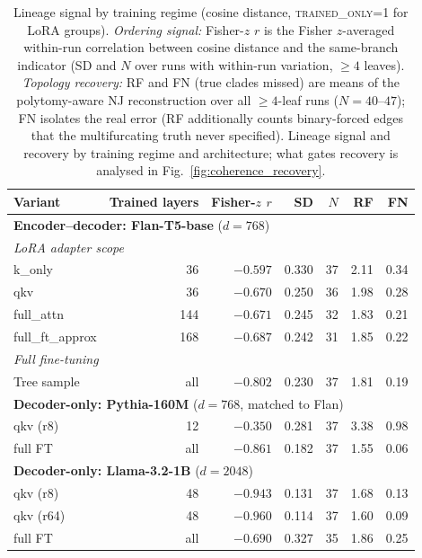 \documentclass{article}
\theoremstyle{definition}
\theoremstyle{plain}
\begin{document}
\begin{table}[t]
\caption{Lineage signal by training regime (cosine distance, \textsc{trained\_only=1} for
  LoRA groups). \emph{Ordering signal:} Fisher-$z$ $r$ is the Fisher $z$-averaged within-run
  correlation between cosine distance and the same-branch indicator (SD and $N$ over runs with
  within-run variation, $\geq 4$ leaves). \emph{Topology recovery:} RF and FN (true clades
  missed) are means of the polytomy-aware NJ reconstruction over all $\geq 4$-leaf runs
  ($N=40$--$47$); FN isolates the real error (RF additionally counts binary-forced edges that
  the multifurcating truth never specified). Lineage signal and recovery by training regime and
  architecture; what gates recovery is analysed in Fig.~\ref{fig:coherence_recovery}.}
\label{tab:variants}
\begin{center}
\begin{tabular}{lrrrrrr}
\toprule
Variant & Trained layers & Fisher-$z$ $r$ & SD & $N$ & RF & FN \\
\midrule
\multicolumn{7}{l}{\textbf{Encoder--decoder: Flan-T5-base} ($d=768$)} \\
\multicolumn{7}{l}{\quad\textit{LoRA adapter scope}} \\
\quad k\_only          &  36 & $-0.597$ & 0.330 & 37 & 2.11 & 0.34 \\
\quad qkv              &  36 & $-0.670$ & 0.250 & 36 & 1.98 & 0.28 \\
\quad full\_attn       & 144 & $-0.671$ & 0.245 & 32 & 1.83 & 0.21 \\
\quad full\_ft\_approx & 168 & $-0.687$ & 0.242 & 31 & 1.85 & 0.22 \\
\multicolumn{7}{l}{\quad\textit{Full fine-tuning}} \\
\quad Tree sample      & all & $-0.802$ & 0.230 & 37 & 1.81 & 0.19 \\
\midrule
\multicolumn{7}{l}{\textbf{Decoder-only: Pythia-160M} ($d=768$, matched to Flan)} \\
\quad qkv (r8)         &  12 & $-0.350$ & 0.281 & 37 & 3.38 & 0.98 \\
\quad full FT          & all & $-0.861$ & 0.182 & 37 & 1.55 & 0.06 \\
\midrule
\multicolumn{7}{l}{\textbf{Decoder-only: Llama-3.2-1B} ($d=2048$)} \\
\quad qkv (r8)         &  48 & $-0.943$ & 0.131 & 37 & 1.68 & 0.13 \\
\quad qkv (r64)        &  48 & $-0.960$ & 0.114 & 37 & 1.60 & 0.09 \\
\quad full FT          & all & $-0.690$ & 0.327 & 35 & 1.86 & 0.25 \\
\bottomrule
\end{tabular}
\end{center}
\end{table}
\end{document}
